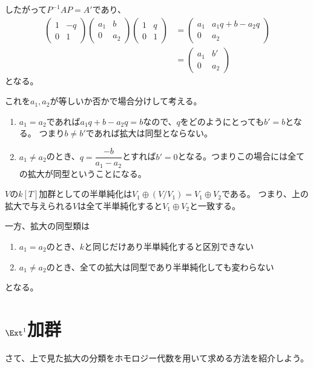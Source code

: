 \documentclass{jsarticle}
\begin{document}
したがって$P^{-1}AP=A'$であり、
\begin{align*}
\begin{pmatrix}1&-q\\0&1\end{pmatrix}\begin{pmatrix}a_1&b\\0&a_2\end{pmatrix}\begin{pmatrix}1&q\\0&1\end{pmatrix}
&=\begin{pmatrix}a_1&a_1q+b-a_2q\\0&a_2\end{pmatrix}\\
&=\begin{pmatrix}a_1&b'\\0&a_2\end{pmatrix}
\end{align*}
となる。

これを$a_1, a_2$が等しいか否かで場合分けして考える。
\begin{enumerate}
\item $a_1=a_2$であれば$a_1q+b-a_2q=b$なので、$q$をどのようにとっても$b'=b$となる。
つまり$b\neq b'$であれば拡大は同型とならない。
\item $a_1\neq a_2$のとき、$q=\dfrac{-b}{a_1-a_2}$とすれば$b'=0$となる。つまりこの場合には全ての拡大が同型ということになる。
\end{enumerate}

$V$の$k[T]$加群としての半単純化は$V_1\oplus (V/V_1)=V_1\oplus V_2$である。
つまり、上の拡大で与えられる$V$は全て半単純化すると$V_1\oplus V_2$と一致する。

一方、拡大の同型類は
\begin{enumerate}
\item $a_1=a_2$のとき、$k$と同じだけあり半単純化すると区別できない
\item $a_1\neq a_2$のとき、全ての拡大は同型であり半単純化しても変わらない
\end{enumerate}
となる。
\section{$\Ext^1$加群}
さて、上で見た拡大の分類をホモロジー代数を用いて求める方法を紹介しよう。
\end{document}
